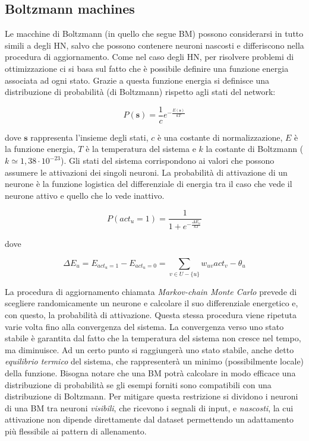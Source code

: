 \documentclass[10pt,a4paper]{article}
\begin{document}
\subsection{Boltzmann machines}

Le macchine di Boltzmann (in quello che segue BM) possono considerarsi in tutto simili a degli HN, salvo che possono contenere neuroni nascosti e differiscono nella procedura di aggiornamento. Come nel caso degli HN, per risolvere problemi di ottimizzazione ci si basa sul fatto che è possibile definire una funzione energia associata ad ogni stato. Grazie a questa funzione energia si definisce una distribuzione di probabilità (di Boltzmann) rispetto agli stati del network:

$$
P(\mathbf{s}) = \frac{1}{c} e^{-\frac{E(\mathbf{s})}{kT}}
$$

dove $\mathbf{s}$ rappresenta l'insieme degli stati, $c$ è una costante di normalizzazione, $E$ è la funzione energia, $T$ è la temperatura del sistema e $k$ la costante di Boltzmann ($k \simeq 1,38 \cdot 10^{-23}$). Gli stati del sistema corrispondono ai valori che possono assumere le attivazioni dei singoli neuroni. La probabilità di attivazione di un neurone è la funzione logistica del differenziale di energia tra il caso che vede il neurone attivo e quello che lo vede inattivo.

$$
P(act_u = 1) = \frac{1}{1 + e^{-\frac{\Delta E_u}{kT}}}
$$

dove 

$$
\Delta E_u = E_{act_u = 1} - E_{act_u = 0} = \sum_{v \in U - \{u\}} w_{uv} act_v - \theta_u
$$
 
La procedura di aggiornamento chiamata \emph{Markov-chain Monte Carlo} prevede di scegliere randomicamente un neurone e calcolare il suo differenziale energetico e, con questo, la probabilità di attivazione. Questa stessa procedura  viene ripetuta varie volta fino alla convergenza del sistema. La convergenza verso uno stato stabile è garantita dal fatto che la temperatura del sistema non cresce nel tempo, ma diminuisce. Ad un certo punto si raggiungerà uno stato stabile, anche detto \emph{equilibrio termico} del sistema, che rappresenterà un minimo (possibilmente locale) della funzione.
Bisogna notare che una BM potrà calcolare in modo efficace una distribuzione di probabilità se gli esempi forniti sono compatibili con una distribuzione di Boltzmann. Per mitigare questa restrizione si dividono i neuroni di una BM tra neuroni \emph{visibili}, che ricevono i segnali di input, e \emph{nascosti}, la cui attivazione non dipende direttamente dal dataset permettendo un adattamento più flessibile ai pattern di allenamento. 
\end{document}
